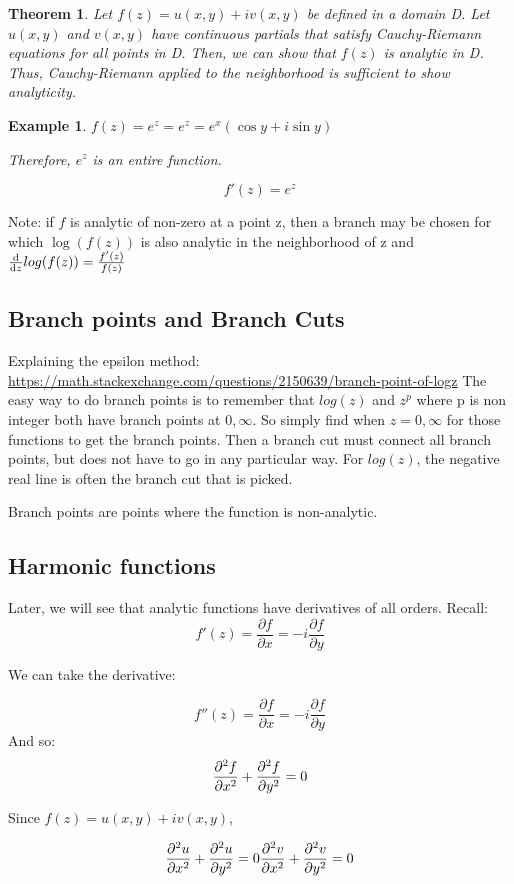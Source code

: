 \documentclass{article}
\newtheorem{theorem}{Theorem}[section]
\newtheorem{ex}{Example}
\theoremstyle{definition}
\begin{document}
\begin{theorem}Let $f(z) = u(x,y)+iv(x,y)$  be defined in a domain D. Let $u(x,y)$ and $v(x,y)$ have continuous partials that satisfy Cauchy-Riemann equations for all points in D. Then, we can show that $f(z)$ is analytic in D. Thus, Cauchy-Riemann applied to the neighborhood is sufficient to show analyticity.
\end{theorem}

\begin{ex}
$f(z)=e^z = e^z=e^x(\cos y + i \sin y)$


Therefore, $e^z$ is an entire function. 

$$f'(z) = e^z$$
\end{ex}

Note: if $f$ is analytic of non-zero at a point z, then a branch may be chosen for which $\log (f(z))$ is also analytic in the neighborhood of z and $\dv{}{z} log(f(z)) = \frac{f'(z)}{f(z)}$


\subsection{Branch points and Branch Cuts}
Explaining the epsilon method: \url{https://math.stackexchange.com/questions/2150639/branch-point-of-logz}
The easy way to do branch points is to remember that $log(z)$ and $z^p$ where p is non integer both have branch points at $0, \infty$. So simply find when $z = 0, \infty$ for those functions to get the branch points. Then a branch cut must connect all branch points, but does not have to go in any particular way. For $log(z)$, the negative real line is often the branch cut that is picked.


Branch points are points where the function is non-analytic. 

\subsection{Harmonic functions}
Later, we will see that analytic functions have derivatives of all orders. Recall:
$$f'(z) = \frac{\partial f}{\partial x} = -i \frac{\partial f}{\partial y}$$

We can take the derivative:

$$f''(z) = \frac{\partial f}{\partial x} = -i \frac{\partial f}{\partial y}$$
And so:
$$\pdv{^2f}{x^2} + \pdv{^2f}{y^2} = 0$$

Since $f(z) = u(x,y) + i v(x,y)$, 

$$\pdv{^2u}{x^2} + \pdv{^2u}{y^2} = 0 \pdv{^2v}{x^2} + \pdv{^2v}{y^2} = 0$$
\end{document}

